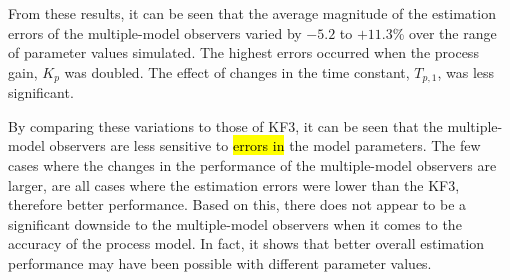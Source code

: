 From these results, it can be seen that the average magnitude of the estimation errors of the multiple-model observers varied by $-5.2$ to $+11.3$\% over the range of parameter values simulated. The highest errors occurred when the process gain, $K_p$ was doubled. The effect of changes in the time constant, $T_{p,1}$, was less significant.

By comparing these variations to those of KF3, it can be seen that the multiple-model observers are less sensitive to \hl{errors in} the model parameters. The few cases where the changes in the performance of the multiple-model observers are larger, are all cases where the estimation errors were lower than the KF3, therefore better performance. Based on this, there does not appear to be a significant downside to the multiple-model observers when it comes to the accuracy of the process model. In fact, it shows that better overall estimation performance may have been possible with different parameter values.

